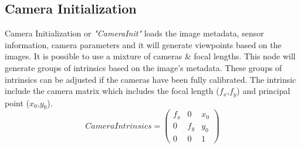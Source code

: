 \documentclass[12pt]{report}
\begin{document}
\subsection{Camera Initialization}
Camera Initialization or \textit{"CameraInit"} loads the image metadata, sensor information, camera parameters and it will  generate viewpoints based on the images.
It is possible to use a mixture of cameras \& focal lengths. This node will generate groups of intrinsics based on the image's metadata. These groups of intrinsics can be adjusted if the cameras have been fully calibrated.
The intrinsic include the camera matrix  which includes the focal length ($f_x$,$f_y$) and principal point ($x_0$,$y_0$).
\begin{equation*}
  Camera Intrinsics = 
  \begin{pmatrix}
  f_x & 0 & x_0 \\
  0 & f_y & y_0 \\
  0 & 0 & 1
  \end{pmatrix}
\end{equation*}
\label{equ:camera_intrisics}
\end{document}
